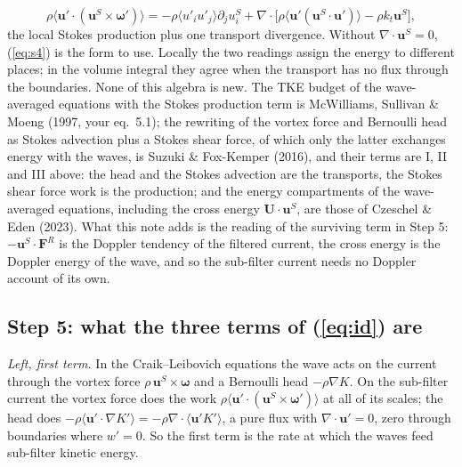 \documentclass[10pt]{article}
\newcommand{\av}[1]{\langle #1\rangle}\newcommand{\uS}{\bm u^S}\newcommand{\WS}{\mathcal W_S}\newcommand{\PS}{\mathcal P_S}
\newcommand{\bu}{\bm u}\newcommand{\bU}{\bm U}\newcommand{\bxi}{\bm\xi}\newcommand{\dd}{\mathrm d}
\begin{document}
\[
\rho\av{\bu'\cdot(\uS\times\bm\omega')}=-\rho\av{u'_iu'_j}\partial_ju^S_i+\nabla\cdot\big[\rho\av{\bu'(\uS\!\cdot\bu')}-\rho k_t\uS\big],
\]
the local Stokes production plus one transport divergence. Without $\nabla\cdot\uS=0$, (\ref{eq:s4}) is the form to use. Locally the two readings assign the energy to different places; in the volume integral they agree when the transport has no flux through the boundaries. None of this algebra is new. The TKE budget of the wave-averaged equations with the Stokes production term is McWilliams, Sullivan \& Moeng (1997, your eq.~5.1); the rewriting of the vortex force and Bernoulli head as Stokes advection plus a Stokes shear force, of which only the latter exchanges energy with the waves, is Suzuki \& Fox-Kemper (2016), and their terms are I, II and III above: the head and the Stokes advection are the transports, the Stokes shear force work is the production; and the energy compartments of the wave-averaged equations, including the cross energy $\bU\!\cdot\uS$, are those of Czeschel \& Eden (2023). What this note adds is the reading of the surviving term in Step 5: $-\uS\!\cdot\bm F^R$ is the Doppler tendency of the filtered current, the cross energy is the Doppler energy of the wave, and so the sub-filter current needs no Doppler account of its own.

\subsection{Step 5: what the three terms of (\ref{eq:id}) are}
\emph{Left, first term.} In the Craik--Leibovich equations the wave acts on the current through the vortex force $\rho\,\uS\times\bm\omega$ and a Bernoulli head $-\rho\nabla K$. On the sub-filter current the vortex force does the work $\rho\av{\bu'\cdot(\uS\times\bm\omega')}$ at all of its scales; the head does $-\rho\av{\bu'\cdot\nabla K'}=-\rho\nabla\cdot\av{\bu'K'}$, a pure flux with $\nabla\cdot\bu'=0$, zero through boundaries where $w'=0$. So the first term is the rate at which the waves feed sub-filter kinetic energy.
\end{document}
